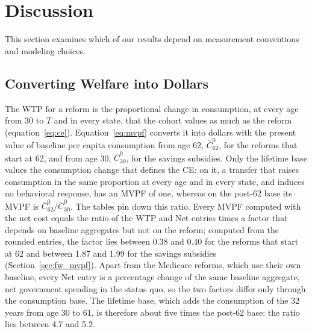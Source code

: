 \section{Discussion}\label{sec:discussion}

This section examines which of our results depend on measurement conventions and modeling choices.

\subsection{Converting Welfare into Dollars}\label{sec:disc_dollars}

The WTP for a reform is the proportional change in consumption, at every age from 30 to $T$ and in every state, that the cohort values as much as the reform (equation~\eqref{eq:ce}). Equation~\eqref{eq:mvpf} converts it into dollars with the present value of baseline per capita consumption from age 62, $\bar C^{0}_{62}$, for the reforms that start at 62, and from age 30, $\bar C^{0}_{30}$, for the savings subsidies. Only the lifetime base values the consumption change that defines the CE: on it, a transfer that raises consumption in the same proportion at every age and in every state, and induces no behavioral response, has an MVPF of one, whereas on the post-62 base its MVPF is $\bar C^{0}_{62}/\bar C^{0}_{30}$. The tables pin down this ratio. Every MVPF computed with the net cost equals the ratio of the WTP and Net entries times a factor that depends on baseline aggregates but not on the reform; computed from the rounded entries, the factor lies between 0.38 and 0.40 for the reforms that start at 62 and between 1.87 and 1.99 for the savings subsidies (Section~\ref{sec:fw_mvpf}). Apart from the Medicare reforms, which use their own baseline, every Net entry is a percentage change of the same baseline aggregate, net government spending in the status quo, so the two factors differ only through the consumption base. The lifetime base, which adds the consumption of the 32 years from age 30 to 61, is therefore about five times the post-62 base: the ratio lies between 4.7 and 5.2. %

